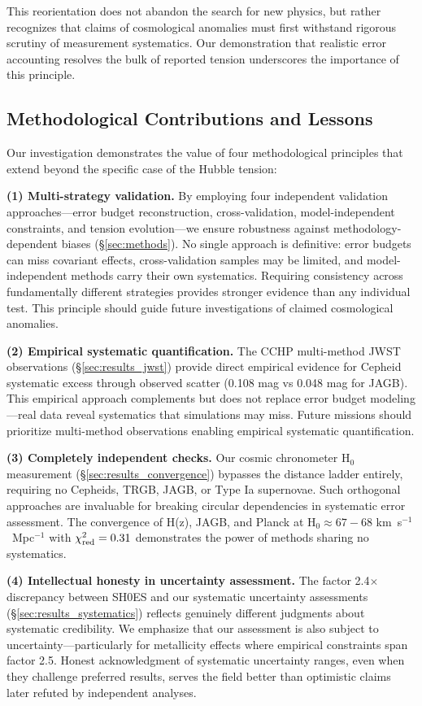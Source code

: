 \documentclass[twocolumn, linenumbers]{aastex701}
\begin{document}
This reorientation does not abandon the search for new physics, but rather recognizes that claims of cosmological anomalies must first withstand rigorous scrutiny of measurement systematics. Our demonstration that realistic error accounting resolves the bulk of reported tension underscores the importance of this principle.

\subsection{Methodological Contributions and Lessons}

Our investigation demonstrates the value of four methodological principles that extend beyond the specific case of the Hubble tension:

\textbf{(1) Multi-strategy validation.} By employing four independent validation approaches---error budget reconstruction, cross-validation, model-independent constraints, and tension evolution---we ensure robustness against methodology-dependent biases (\S\ref{sec:methods}). No single approach is definitive: error budgets can miss covariant effects, cross-validation samples may be limited, and model-independent methods carry their own systematics. Requiring consistency across fundamentally different strategies provides stronger evidence than any individual test. This principle should guide future investigations of claimed cosmological anomalies.

\textbf{(2) Empirical systematic quantification.} The CCHP multi-method JWST observations (\S\ref{sec:results_jwst}) provide direct empirical evidence for Cepheid systematic excess through observed scatter (0.108 mag vs 0.048 mag for JAGB). This empirical approach complements but does not replace error budget modeling---real data reveal systematics that simulations may miss. Future missions should prioritize multi-method observations enabling empirical systematic quantification.

\textbf{(3) Completely independent checks.} Our cosmic chronometer H$_0$ measurement (\S\ref{sec:results_convergence}) bypasses the distance ladder entirely, requiring no Cepheids, TRGB, JAGB, or Type Ia supernovae. Such orthogonal approaches are invaluable for breaking circular dependencies in systematic error assessment. The convergence of H(z), JAGB, and Planck at H$_0 \approx 67-68$ km~s$^{-1}$~Mpc$^{-1}$ with $\chi^2_{\rm red} = 0.31$ demonstrates the power of methods sharing no systematics.

\textbf{(4) Intellectual honesty in uncertainty assessment.} The factor 2.4$\times$ discrepancy between SH0ES and our systematic uncertainty assessments (\S\ref{sec:results_systematics}) reflects genuinely different judgments about systematic credibility. We emphasize that our assessment is also subject to uncertainty---particularly for metallicity effects where empirical constraints span factor 2.5. Honest acknowledgment of systematic uncertainty ranges, even when they challenge preferred results, serves the field better than optimistic claims later refuted by independent analyses.
\end{document}
